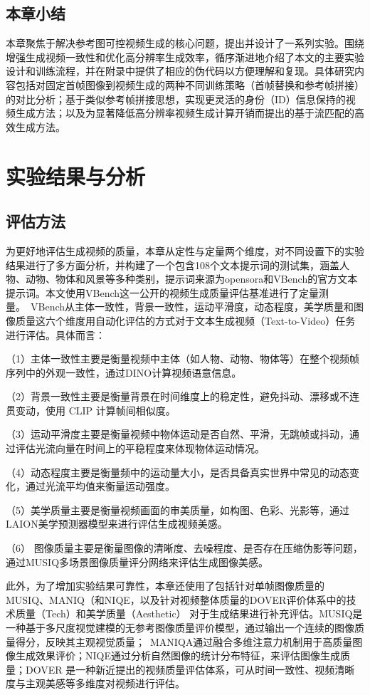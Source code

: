 \subsection{本章小结}
本章聚焦于解决参考图可控视频生成的核心问题，提出并设计了一系列实验。围绕增强生成视频一致性和优化高分辨率生成效率，循序渐进地介绍了本文的主要实验设计和训练流程，并在附录中提供了相应的伪代码以方便理解和复现。具体研究内容包括对固定首帧图像到视频生成的两种不同训练策略（首帧替换和参考帧拼接）的对比分析；基于类似参考帧拼接思想，实现更灵活的身份（ID）信息保持的视频生成方法；以及为显著降低高分辨率视频生成计算开销而提出的基于流匹配的高效生成方法。
\section{实验结果与分析}
\subsection{评估方法}

为更好地评估生成视频的质量，本章从定性与定量两个维度，对不同设置下的实验结果进行了多方面分析，并构建了一个包含108个文本提示词的测试集，涵盖人物、动物、物体和风景等多种类别，提示词来源为opensora和VBench的官方文本提示词。本文使用VBench这一公开的视频生成质量评估基准进行了定量测量。\
VBench从主体一致性，背景一致性，运动平滑度，动态程度，美学质量和图像质量这六个维度用自动化评估的方式对于文本生成视频（Text-to-Video）任务进行评估。具体而言：

（1）主体一致性主要是衡量视频中主体（如人物、动物、物体等）在整个视频帧序列中的外观一致性，通过DINO计算视频语意信息。

（2）背景一致性主要是衡量背景在时间维度上的稳定性，避免抖动、漂移或不连贯变动，使用 CLIP 计算帧间相似度。

（3）运动平滑度主要是衡量视频中物体运动是否自然、平滑，无跳帧或抖动，通过评估光流向量在时间上的平稳程度来体现物体运动情况。

（4）动态程度主要是衡量频中的运动量大小，是否具备真实世界中常见的动态变化，通过光流平均值来衡量运动强度。

（5）美学质量主要是衡量视频画面的审美质量，如构图、色彩、光影等，通过LAION美学预测器模型来进行评估生成视频美感。

（6） 图像质量主要是衡量图像的清晰度、去噪程度、是否存在压缩伪影等问题，通过MUSIQ多场景图像质量评分网络来评估生成图像美感。

此外，为了增加实验结果可靠性，本章还使用了包括针对单帧图像质量的MUSIQ\cite{ke2021musiq}、MANIQ\cite{maniqa}（和NIQE\cite{niqe}，以及针对视频整体质量的DOVER\cite{dover}评价体系中的技术质量（Tech）和美学质量（Aesthetic）
对于生成结果进行补充评估。MUSIQ是一种基于多尺度视觉建模的无参考图像质量评价模型，通过输出一个连续的图像质量得分，反映其主观视觉质量；\
MANIQA通过融合多维注意力机制用于高质量图像生成效果评价；NIQE通过分析自然图像的统计分布特征，来评估图像生成质量；DOVER 是一种新近提出的视频质量评估体系，可从时间一致性、视频清晰度与主观美感等多维度对视频进行评估。


